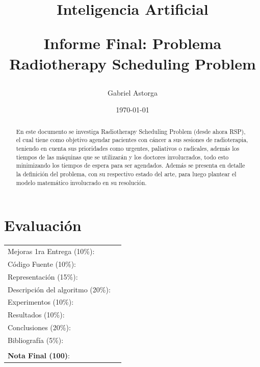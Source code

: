 \documentclass[letter, 10pt]{article}
\begin{document}
\title{Inteligencia Artificial \\ \begin{Large}Informe Final: Problema Radiotherapy Scheduling Problem\end{Large}}
\author{Gabriel Astorga}
\date{\today}
\maketitle


\section*{Evaluaci\'on}

\begin{tabular}{ll}
Mejoras 1ra Entrega (10\%): &  \underline{\hspace{2cm}}\\
C\'odigo Fuente (10\%): &  \underline{\hspace{2cm}}\\
Representaci\'on (15\%):  & \underline{\hspace{2cm}} \\
Descripci\'on del algoritmo (20\%):  & \underline{\hspace{2cm}} \\
Experimentos (10\%):  & \underline{\hspace{2cm}} \\
Resultados (10\%):  & \underline{\hspace{2cm}} \\
Conclusiones (20\%): &  \underline{\hspace{2cm}}\\
Bibliograf\'ia (5\%): & \underline{\hspace{2cm}}\\
 &  \\
\textbf{Nota Final (100)}:   & \underline{\hspace{2cm}}
\end{tabular}

\begin{abstract}

En este documento se investiga Radiotherapy Scheduling Problem (desde ahora RSP), el cual  tiene como objetivo agendar pacientes con cáncer a sus sesiones de radioterapia, teniendo en cuenta sus prioridades como urgentes, paliativos o radicales, además los tiempos de las máquinas que se utilizarán y los doctores involucrados, todo esto minimizando los tiempos de espera para ser agendados. Además se presenta en detalle la definición del problema, con su respectivo estado del arte, para luego plantear el modelo matemático involucrado en su resolución.
\end{abstract}
\end{document}
